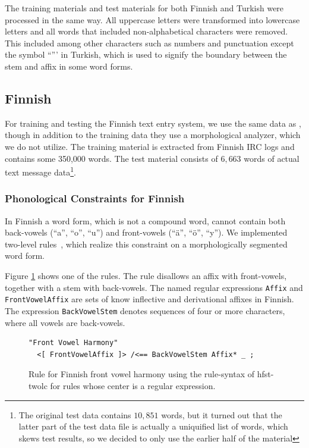 \documentclass{llncs}
\begin{document}
The training materials and test materials for both Finnish and Turkish
were processed in the same way. All uppercase letters were transformed
into lowercase letters and all words that included non-alphabetical
characters were removed. This included among other characters such as
numbers and punctuation except the symbol ``''' in Turkish, which is
used to signify the boundary between the stem and affix in some word
forms.

\subsection{Finnish}

For training and testing the Finnish text entry system, we use the
same data as \cite{silfverberg/2011/cla}, though in addition to the training data they use a
morphological analyzer, which we do not utilize. The training material
is extracted from Finnish IRC logs and contains some 350,000
words. The test material consists of $6,663$ words of actual text
message data\footnote{The original test data contains $10,851$ words,
  but it turned out that the latter part of the test data file is
  actually a uniquified list of words, which skews test results, so we
  decided to only use the earlier half of the material}.

\subsubsection{Phonological Constraints for Finnish}

In Finnish a word form, which is not a compound word, cannot contain
both back-vowels (``a'', ``o'', ``u'') and front-vowels (``ä'', ``ö'',
``y''). We implemented two-level rules~\cite{koskenniemi/1983}, which
realize this constraint on a morphologically segmented word form.

Figure \ref{fi-constraints} shows one of the rules. The rule disallows
an affix with front-vowels, together with a stem with back-vowels. The
named regular expressions \verb|Affix| and \verb|FrontVowelAffix| are
sets of know inflective and derivational affixes in Finnish. The
expression \verb|BackVowelStem| denotes sequences of four or more
characters, where all vowels are back-vowels.

\begin{figure}
\begin{verbatim}
"Front Vowel Harmony"
  <[ FrontVowelAffix ]> /<== BackVowelStem Affix* _ ; 
\end{verbatim}
\caption{Rule for Finnish front vowel harmony using the rule-syntax of hfst-twolc for rules whose center is a regular expression.}\label{fi-constraints}
\end{figure}
\end{document}
